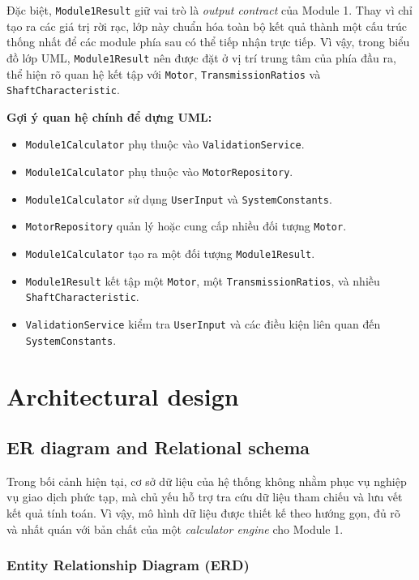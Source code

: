 \documentclass[a4paper]{article}
\begin{document}
Đặc biệt, \texttt{Module1Result} giữ vai trò là \textit{output contract} của Module 1. Thay vì chỉ tạo ra các giá trị rời rạc, lớp này chuẩn hóa toàn bộ kết quả thành một cấu trúc thống nhất để các module phía sau có thể tiếp nhận trực tiếp. Vì vậy, trong biểu đồ lớp UML, \texttt{Module1Result} nên được đặt ở vị trí trung tâm của phía đầu ra, thể hiện rõ quan hệ kết tập với \texttt{Motor}, \texttt{TransmissionRatios} và \texttt{ShaftCharacteristic}.

\textbf{Gợi ý quan hệ chính để dựng UML:}
\begin{itemize}
\item \texttt{Module1Calculator} phụ thuộc vào \texttt{ValidationService}.
\item \texttt{Module1Calculator} phụ thuộc vào \texttt{MotorRepository}.
\item \texttt{Module1Calculator} sử dụng \texttt{UserInput} và \texttt{SystemConstants}.
\item \texttt{MotorRepository} quản lý hoặc cung cấp nhiều đối tượng \texttt{Motor}.
\item \texttt{Module1Calculator} tạo ra một đối tượng \texttt{Module1Result}.
\item \texttt{Module1Result} kết tập một \texttt{Motor}, một \texttt{TransmissionRatios}, và nhiều \texttt{ShaftCharacteristic}.
\item \texttt{ValidationService} kiểm tra \texttt{UserInput} và các điều kiện liên quan đến \texttt{SystemConstants}.
\end{itemize}

\section{Architectural design}
\subsection{ER diagram and Relational schema}
Trong bối cảnh hiện tại, cơ sở dữ liệu của hệ thống không nhằm phục vụ nghiệp vụ giao dịch phức tạp, mà chủ yếu hỗ trợ tra cứu dữ liệu tham chiếu và lưu vết kết quả tính toán. Vì vậy, mô hình dữ liệu được thiết kế theo hướng gọn, đủ rõ và nhất quán với bản chất của một \textit{calculator engine} cho Module 1.

\subsubsection{Entity Relationship Diagram (ERD)}
\end{document}
